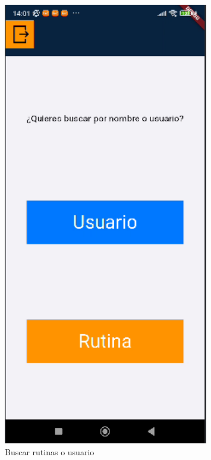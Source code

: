 \begin{figure}[H]
   \centering
    \includegraphics[width=0.8\textwidth]{pantallas/buscarRutinasNomOUser.png}
    \caption{Buscar rutinas o usuario}
    \label{fig:buscarRutinasNomOUser}
\end{figure}

